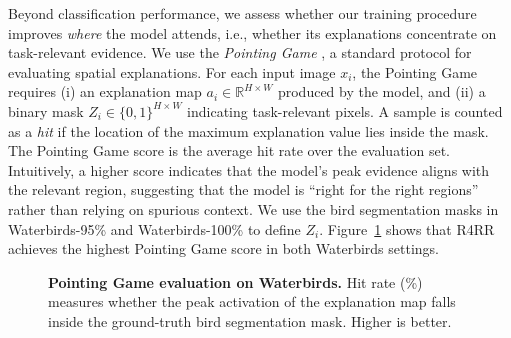 Beyond classification performance, we assess whether our training procedure improves \emph{where} the model attends, i.e., whether its explanations concentrate on task-relevant evidence. We use the \emph{Pointing Game} \cite{zhang2018top}, a standard protocol for evaluating spatial explanations. For each input image $x_i$, the Pointing Game requires (i) an explanation map $a_i \in \mathbb{R}^{H\times W}$ produced by the model, and (ii) a binary mask $Z_i \in \{0,1\}^{H\times W}$ indicating task-relevant pixels. A sample is counted as a \emph{hit} if the location of the maximum explanation value lies inside the mask. The Pointing Game score is the average hit rate over the evaluation set. Intuitively, a higher score indicates that the model's peak evidence aligns with the relevant region, suggesting that the model is ``right for the right regions'' rather than relying on spurious context. We use the bird segmentation masks in Waterbirds-95\% and Waterbirds-100\% to define $Z_i$. Figure~\ref{fig:pointing_game} shows that R4RR achieves the highest Pointing Game score in both Waterbirds settings.


\begin{figure}[t]
\centering
{}

\vspace{-0.5em}
\caption{
\textbf{Pointing Game evaluation on Waterbirds.}
Hit rate (\%) measures whether the peak activation of the explanation map falls inside the ground-truth bird segmentation mask. Higher is better.
}
\label{fig:pointing_game}
\end{figure}



